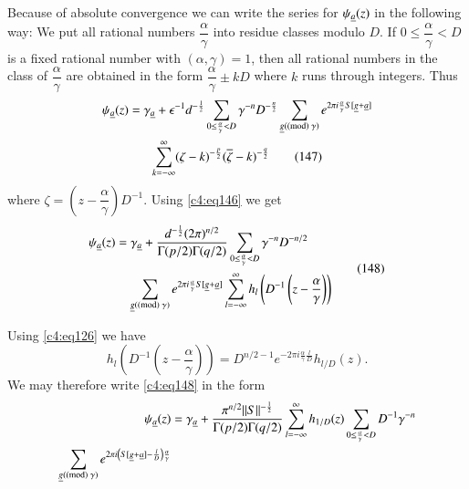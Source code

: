 Because of absolute convergence we can write the series for
$\psi_{\underline{a}}(z)$ in the following way: We put all rational numbers
$\dfrac{\alpha}{\gamma}$ into residue classes modulo $D$. If $0\leq
\dfrac{\alpha}{\gamma}<D$ is a fixed rational number with
$(\alpha,\gamma)=1$, then all rational numbers in the class of
$\dfrac{\alpha}{\gamma}$ are obtained in the form
$\dfrac{\alpha}{\gamma}\pm kD$ where $k$ runs through integers. Thus 
\begin{gather*}
\psi_{\underline{a}}(z)=\gamma_{\underline{a}}+\epsilon^{-1}d^{-\frac{1}{2}}\sum_{0\leq
  \frac{\alpha}{\gamma}<D}\gamma^{-n}D^{-\frac{n}{2}}\sum_{\underline{g}(\rm(mod) \; \gamma)}e^{2\pi
  i\frac{\alpha}{\gamma}S[\underline{g}+\underline{a}]}\\
\sum^{\infty}_{k=-\infty}(\zeta-k)^{-\frac{p}{2}}(\overline{\zeta}-k)^{-\frac{q}{2}}\tag{147}
\label{c4:eq147} 
\end{gather*}
where $\zeta=\left(z-\dfrac{\alpha}{\gamma}\right)D^{-1}$. Using
\eqref{c4:eq146} we get 
\begin{equation*}
\begin{aligned}
\psi_{\underline{a}}(z) &=
\gamma_{\underline{a}}+\frac{d^{-\frac{1}{2}}(2\pi)^{n/2}}{\Gamma(p/2)\Gamma(q/2)}\sum_{0\leq
  \frac{\alpha}{\gamma}<D}\gamma^{-n}D^{-n/2}\\
&\quad \sum_{\underline{g}(\rm(mod) \; \gamma)}e^{2\pi
  i\frac{\alpha}{\gamma}S[\underline{g}+\underline{a}]}
\sum^{\infty}_{l=-\infty}h_{l}\left(D^{-1}
\left(z-\frac{\alpha}{\gamma}\right)\right) 
\end{aligned}\tag{148}\label{c4:eq148}
\end{equation*}\pageoriginale

Using \eqref{c4:eq126} we have
$$
h_{l}\left(D^{-1}\left(z-\frac{\alpha}{\gamma}\right)\right)=D^{n/2-1}e^{-2\pi
  i\frac{\alpha}{\gamma}\frac{l}{D}}h_{l/D}(z). 
$$
We may therefore write \eqref{c4:eq148} in the form
\begin{align*}
\psi_{\underline{a}}(z) &=
\gamma_{\underline{a}}+\frac{\pi^{n/2}||S||^{-\frac{1}{2}}}{\Gamma(p/2)\Gamma(q/2)}
\sum^{\infty}_{l=-\infty}h_{1/D}(z)\sum_{0\leq
  \frac{\alpha}{\gamma}<D}D^{-1}\gamma^{-n}\\
\sum_{\underline{g}(\rm(mod) \; \gamma)}e^{2\pi
  i\left(S[\underline{g}+\underline{a}]-\frac{l}{D}\right)\frac{\alpha}{\gamma}}
\end{align*}

